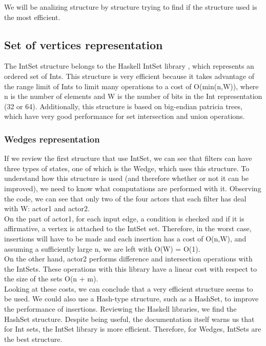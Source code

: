 We will be analizing structure by structure trying to find if the structure used is the most efficient.
\subsection{Set of vertices representation}
The IntSet structure belongs to the Haskell IntSet library \cite{noauthor_dataintset_nodate}, which represents an ordered set of Ints.
This structure is very efficient because it takes advantage of the range limit of Ints to limit many operations to a cost of O(min(n,W)), where n is the number of elements and W is the number of bits in the Int representation (32 or 64).
Additionally, this structure is based on big-endian patricia trees, which have very good performance for set intersection and union operations.

\subsubsection*{Wedges representation}
If we review the first structure that use IntSet, we can see that filters can have three types of states, one of which is the Wedge, which uses this structure.
To understand how this structure is used (and therefore whether or not it can be improved), we need to know what computations are performed with it.
Observing the code, we can see that only two of the four actors that each filter has deal with W: actor1 and actor2.\\
On the part of actor1, for each input edge, a condition is checked and if it is affirmative, a vertex is attached to the IntSet set.
Therefore, in the worst case, insertions will have to be made and each insertion has a cost of O(n,W), and assuming a sufficiently large n, we are left with O(W) = O(1). \\
On the other hand, actor2 performs difference and intersection operations with the IntSets.
These operations with this library have a linear cost with respect to the size of the sets O(n + m). \\

Looking at these costs, we can conclude that a very efficient structure seems to be used.
We could also use a Hash-type structure, such as a HashSet, to improve the performance of insertions.
Reviewing the Haskell libraries, we find the HashSet structure.
Despite being useful, the documentation itself warns us that for Int sets, the IntSet library is more efficient.
Therefore, for Wedges, IntSets are the best structure.

